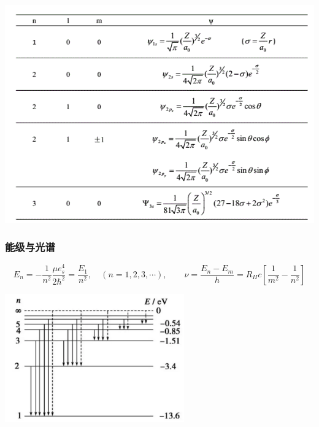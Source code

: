 \begin{frame}
	  \frametitle{}
	  \begin{center}
		\includegraphics[width=1\textwidth]{figs/orbitals.png}
   \end{center}
\end{frame}

\begin{frame}
	  \frametitle{能级与光谱}
	  \[ E_n = - \frac{1}{n^2} \frac{\mu e^4 _s }{2 \hbar ^2} =\frac{E_1}{n^2}, \quad (n=1,2,3,\cdots) , \qquad \nu=\frac{E_n -E_m}{h} = R_H c [\frac{1}{m^2} -\frac{1}{n^2}]
	  \]
	  \begin{center}
		   \includegraphics[width=0.58\textwidth]{figs/2022-03-28-23-37-55.png}
	  \end{center}
\end{frame}

